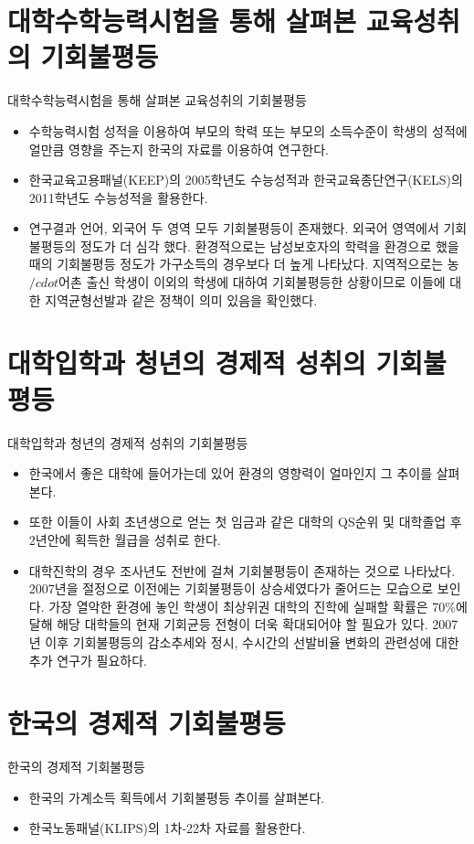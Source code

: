\documentclass[handout, 10pt]{beamer}
\begin{document}
\section{대학수학능력시험을 통해 살펴본 교육성취의 기회불평등}
\begin{frame}{대학수학능력시험을 통해 살펴본 교육성취의 기회불평등}
    \begin{itemize}
        \item 수학능력시험 성적을 이용하여 부모의 학력 또는 부모의 소득수준이 학생의 성적에 얼만큼 영향을 주는지 한국의 자료를 이용하여 연구한다.
        \item 한국교육고용패널(KEEP)의 2005학년도 수능성적과 한국교육종단연구(KELS)의 2011학년도 수능성적을 활용한다.
        \item 연구결과 언어, 외국어 두 영역 모두 기회불평등이 존재했다. 외국어 영역에서 기회불평등의 정도가 더 심각 했다. 환경적으로는 남성보호자의 학력을 환경으로 했을때의 기회불평등 정도가 가구소득의 경우보다 더 높게 나타났다. 지역적으로는 농$/cdot$어촌 출신 학생이 이외의 학생에 대하여 기회불평등한 상황이므로 이들에 대한 지역균형선발과 같은 정책이 의미 있음을 확인했다.
    \end{itemize}
\end{frame}

\section{대학입학과 청년의 경제적 성취의 기회불평등}
\begin{frame}{대학입학과 청년의 경제적 성취의 기회불평등}
    \begin{itemize}
        \item 한국에서 좋은 대학에 들어가는데 있어 환경의 영향력이 얼마인지 그 추이를 살펴본다.
        \item 또한 이들이 사회 초년생으로 얻는 첫 임금과 같은 대학의 QS순위 및 대학졸업 후 2년안에 획득한 월급을 성취로 한다.
        \item 대학진학의 경우 조사년도 전반에 걸쳐 기회불평등이 존재하는 것으로 나타났다. 2007년을 절정으로 이전에는 기회불평등이 상승세였다가 줄어드는 모습으로 보인다. 가장 열악한 환경에 놓인 학생이 최상위권 대학의 진학에 실패할 확률은 70\%에 달해 해당 대학들의 현재 기회균등 전형이 더욱 확대되어야 할 필요가 있다. 2007년 이후 기회불평등의 감소추세와 정시, 수시간의 선발비율 변화의 관련성에 대한 추가 연구가 필요하다.
    \end{itemize}
\end{frame}

\section{한국의 경제적 기회불평등}
\begin{frame}{한국의 경제적 기회불평등}
    \begin{itemize}
        \item 한국의 가계소득 획득에서 기회불평등 추이를 살펴본다.
        \item 한국노동패널(KLIPS)의 1차-22차 자료를 활용한다.
    \end{itemize}
\end{frame}
\end{document}
